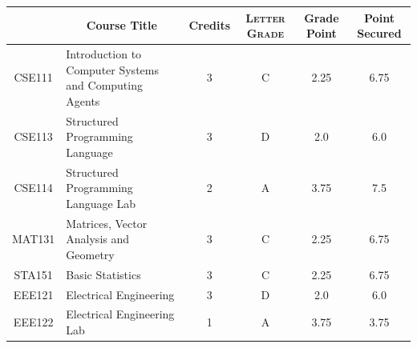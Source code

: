 \documentclass[11pt]{article}
\newcommand*{\numtwo}[1]{\pgfmathprintnumber[
                    fixed, precision=2, fixed zerofill=true]{#1}}
\begin{document}
                \begin{center}
                    \renewcommand{\arraystretch}{1.08}
                    
                \begin{tabular}{|c|l|c|>{\scshape}c|c|c|}
                \hline  \rule[-1ex]{0pt}{3.5ex} {\centering{\bf Course Code}} &  \multicolumn{1}{c|}{\textbf{Course Title}}  & {\bf Credits} & {\bf Letter Grade} & {\bf Grade Point} & {\bf Point Secured}  \\ 
                \hline   CSE111 &  Introduction to Computer Systems and Computing Agents		 & 3 & C & 2.25 & 6.75 \\ %
                \hline   CSE113 &  Structured Programming Language		 & 3 & D & 2.0 & 6.0 \\ %
                \hline   CSE114 &  Structured Programming Language Lab		 & 2 & A & 3.75 & 7.5 \\ %
                \hline   MAT131 &  Matrices, Vector Analysis and Geometry		 & 3 & C & 2.25 & 6.75 \\ %
                \hline   STA151 &  Basic Statistics		 & 3 & C & 2.25 & 6.75 \\ %
                \hline   EEE121 &  Electrical Engineering		 & 3 & D & 2.0 & 6.0 \\ %
                \hline   EEE122 &  Electrical Engineering Lab		 & 1 & A & 3.75 & 3.75 \\ %

\hline                %
                \end{tabular}
                \end{center}
                \renewcommand{\arraystretch}{1.03}
\end{document}
